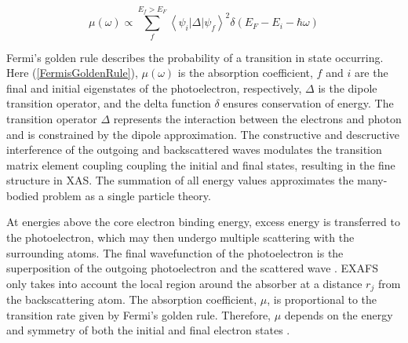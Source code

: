 \begin{equation}
    \label{FermisGoldenRule}
    \mu(\omega) \varpropto  \sum_{f}^{E_f > E_F} \left\langle \psi_i \lvert \Delta \rvert \psi_f \right\rangle ^2 \delta (E_F - E_i - \hbar \omega)  
\end{equation}


\noindent Fermi's golden rule describes the probability of a transition in state occurring. Here (\ref{FermisGoldenRule}), $ \mu(\omega) $ is the absorption coefficient, $ f $ and $ i $ are the final and initial eigenstates of the photoelectron, respectively, $ \Delta $ is the dipole transition operator, and the delta function $ \delta $ ensures conservation of energy. The transition operator $ \Delta $ represents the interaction between the electrons and photon and is constrained by the dipole approximation. The constructive and descructive interference of the outgoing and backscattered waves modulates the transition matrix element coupling coupling the initial and final states, resulting in the fine structure in XAS. The summation of all energy values approximates the many-bodied problem as a single particle theory. 

At energies above the core electron binding energy, excess energy is transferred to the photoelectron, which may then undergo multiple scattering with the surrounding atoms. The final wavefunction of the photoelectron is the superposition of the outgoing photoelectron and the scattered wave \cite{anotherxafstocite}. EXAFS only takes into account the local region around the absorber at a distance $ r_j $  from the backscattering atom. The absorption coefficient, $ \mu $, is proportional to the transition rate given by Fermi’s golden rule. Therefore,  $ \mu $ depends on the energy and symmetry of both the initial and final electron states \cite{xafsXanesFermisGoldenRule}. 


